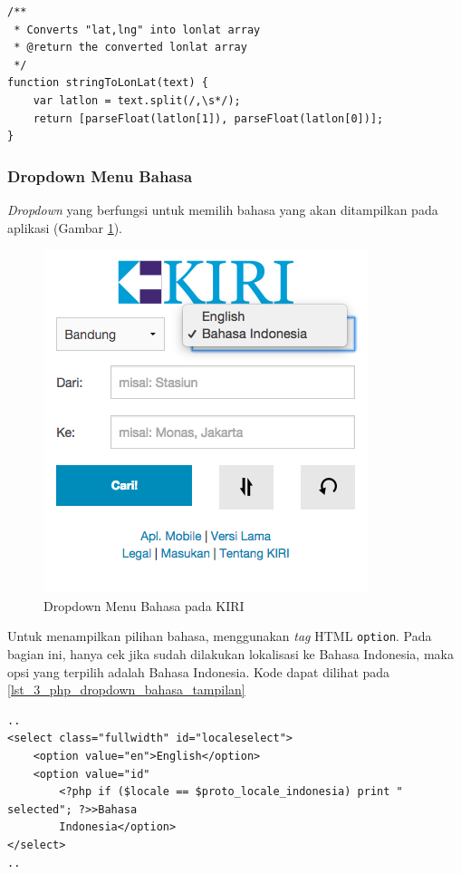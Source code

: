 \begin{lstlisting}[caption=Fungsi JavaScript untuk mengubah String menjadi \textit{array} Float ,label = {lst_3_php_dropdown_kota_parse}]
/**
 * Converts "lat,lng" into lonlat array
 * @return the converted lonlat array
 */
function stringToLonLat(text) {
	var latlon = text.split(/,\s*/);
	return [parseFloat(latlon[1]), parseFloat(latlon[0])];
}
\end{lstlisting}

\subsubsection{Dropdown Menu Bahasa}
\textit{Dropdown} yang berfungsi untuk memilih bahasa yang akan ditampilkan pada aplikasi (Gambar \ref{fig:3_KIRI_drop_bahasa}).

\begin{figure}[H]
	\centering
	\includegraphics[scale=0.5]{Gambar/KIRI-drop-bahasa}
	\caption{Dropdown Menu Bahasa pada KIRI} 
	\label{fig:3_KIRI_drop_bahasa}
\end{figure}

Untuk menampilkan pilihan bahasa, menggunakan \textit{tag} HTML \verb!option!. Pada bagian ini, hanya cek jika sudah dilakukan lokalisasi ke Bahasa Indonesia, maka opsi yang terpilih adalah Bahasa Indonesia. Kode dapat dilihat pada \ref{lst_3_php_dropdown_bahasa_tampilan}

\begin{lstlisting}[caption=Menampilkan pilihan bahasa kepada pengguna ,label = {lst_3_php_dropdown_bahasa_tampilan}]
..
<select class="fullwidth" id="localeselect">
	<option value="en">English</option>
	<option value="id"
		<?php if ($locale == $proto_locale_indonesia) print " selected"; ?>>Bahasa
		Indonesia</option>
</select>
..
\end{lstlisting}

